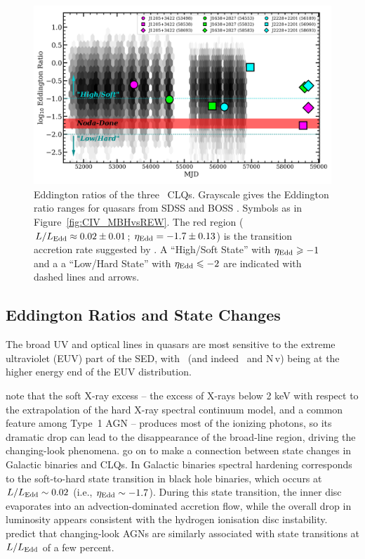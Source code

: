 \documentclass[fleqn,usenatbib]{mnras}
\begin{document}
\begin{figure}
  \centering
  \includegraphics[width=14.5cm, trim=0.2cm 0.2cm 0.0cm 0.2cm, clip]
  {figures/MJD_vs_Eddington_20191211}
  \vspace{-12pt}
  \caption[]{Eddington ratios of the three \civ\ CLQs.  Grayscale gives the
    Eddington ratio ranges for quasars from SDSS \citet[][]{Shen2011} and
    BOSS \citep[][]{Kozlowski2017}.  Symbols as in
    Figure~\ref{fig:CIV_MBHvsREW}.  The red region ($L / L_{\rm Edd}
    \approx 0.02 \pm 0.01$; $\eta_{\rm Edd} = -1.7 \pm 0.13$) is the
    transition accretion rate suggested by \citet{NodaDone2018}.  A
    ``High/Soft State'' with $\eta_{\rm Edd} \geq -1$ and a a ``Low/Hard
    State'' with $\eta_{\rm Edd} \leq -2$ are indicated with dashed lines
    and arrows.}
  \label{fig:Eddington_ratios}
\end{figure}

\subsection{Eddington Ratios and State Changes} 
The broad UV and optical lines in quasars are most sensitive to the
extreme ultraviolet (EUV) part of the SED, with \civ\ (and indeed 
\heii\ and N\,{\sc v}) being at the higher energy end of the EUV
distribution.

\citet{NodaDone2018} note that the soft X-ray excess -- the excess of
X-rays below 2 keV with respect to the extrapolation of the hard X-ray
spectral continuum model, and a common feature among Type~1 AGN --
produces most of the ionizing photons, so its dramatic drop can lead
to the disappearance of the broad-line region, driving the
changing-look phenomena. \citet{NodaDone2018} go on to make a
connection between state changes in Galactic binaries and CLQs.
%
In Galactic binaries spectral hardening
corresponds to the soft-to-hard state transition in black hole
binaries, which occurs at $L / L_{\rm Edd} \sim 0.02$ (i.e.,
$\eta_{\rm Edd} \sim -1.7$).  During this state transition, the inner
disc evaporates into an advection-dominated accretion flow, while the
overall drop in luminosity appears consistent with the hydrogen
ionisation disc instability.  \citet{NodaDone2018} predict that
changing-look AGNs are similarly associated with state transitions at
$L / L_{\rm Edd}$ of a few percent.
\end{document}
